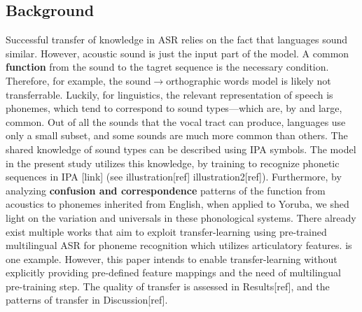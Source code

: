 \documentclass[11pt]{article}
\begin{document}
\subsection{Background} Successful transfer of knowledge in ASR relies on the fact that languages sound similar. However, acoustic sound is just the input part of the model. A common \textbf{function} from the sound to the tagret sequence is the necessary condition. Therefore, for example, the sound$\to$orthographic words model is likely not transferrable. Luckily, for linguistics, the relevant representation of speech is phonemes, which tend to correspond to sound types---which are, by and large, common. Out of all the sounds that the vocal tract can produce, languages use only a small subset, and some sounds are much more common than others. \cite{hayes2009} The shared knowledge of sound types can be described using IPA symbols. \cite{ladefoged2011} The model in the present study utilizes this knowledge, by training to recognize phonetic sequences in IPA [link] (see illustration[ref] illustration2[ref]). Furthermore, by analyzing \textbf{confusion and correspondence} patterns of the function from acoustics to phonemes inherited from English, when applied to Yoruba, we shed light on the variation and universals in these phonological systems. There already exist multiple works that aim to exploit transfer-learning using pre-trained multilingual ASR for phoneme recognition which utilizes articulatory features. \citet{xu2021} is one example. However, this paper intends to enable transfer-learning without explicitly providing pre-defined feature mappings and the need of multilingual pre-training step. The quality of transfer is assessed in Results[ref], and the patterns of transfer in Discussion[ref].
\end{document}
